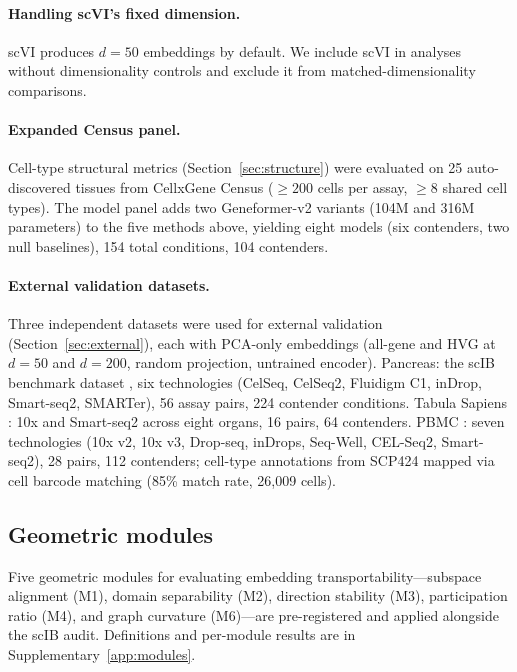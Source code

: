 \documentclass[11pt]{article}
\begin{document}
\paragraph{Handling scVI's fixed dimension.} scVI produces $d = 50$ embeddings by default. We include scVI in analyses without dimensionality controls and exclude it from matched-dimensionality comparisons.

\paragraph{Expanded Census panel.} Cell-type structural metrics (Section~\ref{sec:structure}) were evaluated on 25 auto-discovered tissues from CellxGene Census ($\geq 200$ cells per assay, $\geq 8$ shared cell types). The model panel adds two Geneformer-v2 variants (104M and 316M parameters) to the five methods above, yielding eight models (six contenders, two null baselines), 154 total conditions, 104 contenders.

\paragraph{External validation datasets.} Three independent datasets were used for external validation (Section~\ref{sec:external}), each with PCA-only embeddings (all-gene and HVG at $d = 50$ and $d = 200$, random projection, untrained encoder). Pancreas: the scIB benchmark dataset \citep{luecken2022scib}, six technologies (CelSeq, CelSeq2, Fluidigm C1, inDrop, Smart-seq2, SMARTer), 56 assay pairs, 224 contender conditions. Tabula Sapiens \citep{tabulasapiens2022}: 10x and Smart-seq2 across eight organs, 16 pairs, 64 contenders. PBMC \citep{ding2020systematic}: seven technologies (10x v2, 10x v3, Drop-seq, inDrops, Seq-Well, CEL-Seq2, Smart-seq2), 28 pairs, 112 contenders; cell-type annotations from SCP424 mapped via cell barcode matching (85\% match rate, 26{,}009 cells).

\subsection{Geometric modules}

Five geometric modules for evaluating embedding transportability---subspace alignment (M1), domain separability (M2), direction stability (M3), participation ratio (M4), and graph curvature (M6)---are pre-registered and applied alongside the scIB audit. Definitions and per-module results are in Supplementary~\ref{app:modules}.
\end{document}
